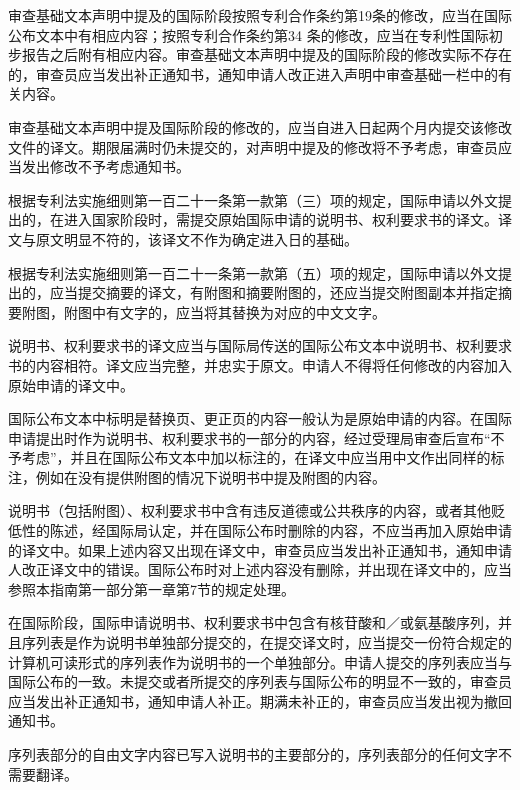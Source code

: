 审查基础文本声明中提及的国际阶段按照专利合作条约第19条的修改，应当在国际公布文本中有相应内容；按照专利合作条约第34 条的修改，应当在专利性国际初步报告之后附有相应内容。审查基础文本声明中提及的国际阶段的修改实际不存在的，审查员应当发出补正通知书，通知申请人改正进入声明中审查基础一栏中的有关内容。

审查基础文本声明中提及国际阶段的修改的，应当自进入日起两个月内提交该修改文件的译文。期限届满时仍未提交的，对声明中提及的修改将不予考虑，审查员应当发出修改不予考虑通知书。

根据专利法实施细则第一百二十一条第一款第（三）项的规定，国际申请以外文提出的，在进入国家阶段时，需提交原始国际申请的说明书、权利要求书的译文。译文与原文明显不符的，该译文不作为确定进入日的基础。

根据专利法实施细则第一百二十一条第一款第（五）项的规定，国际申请以外文提出的，应当提交摘要的译文，有附图和摘要附图的，还应当提交附图副本并指定摘要附图，附图中有文字的，应当将其替换为对应的中文文字。

说明书、权利要求书的译文应当与国际局传送的国际公布文本中说明书、权利要求书的内容相符。译文应当完整，并忠实于原文。申请人不得将任何修改的内容加入原始申请的译文中。

国际公布文本中标明是替换页、更正页的内容一般认为是原始申请的内容。在国际申请提出时作为说明书、权利要求书的一部分的内容，经过受理局审查后宣布“不予考虑”，并且在国际公布文本中加以标注的，在译文中应当用中文作出同样的标注，例如在没有提供附图的情况下说明书中提及附图的内容。

说明书（包括附图）、权利要求书中含有违反道德或公共秩序的内容，或者其他贬低性的陈述，经国际局认定，并在国际公布时删除的内容，不应当再加入原始申请的译文中。如果上述内容又出现在译文中，审查员应当发出补正通知书，通知申请人改正译文中的错误。国际公布时对上述内容没有删除，并出现在译文中的，应当参照本指南第一部分第一章第7节的规定处理。

在国际阶段，国际申请说明书、权利要求书中包含有核苷酸和／或氨基酸序列，并且序列表是作为说明书单独部分提交的，在提交译文时，应当提交一份符合规定的计算机可读形式的序列表作为说明书的一个单独部分。申请人提交的序列表应当与国际公布的一致。未提交或者所提交的序列表与国际公布的明显不一致的，审查员应当发出补正通知书，通知申请人补正。期满未补正的，审查员应当发出视为撤回通知书。

序列表部分的自由文字内容已写入说明书的主要部分的，序列表部分的任何文字不需要翻译。

